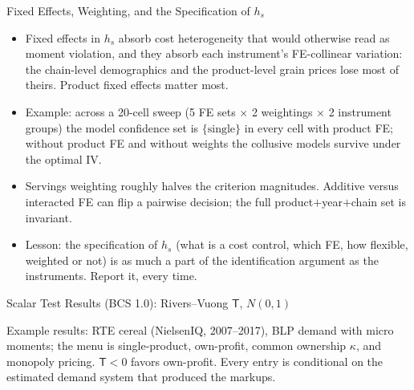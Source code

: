 \documentclass[aspectratio=169,10pt]{beamer}
\begin{document}
\begin{frame}{Fixed Effects, Weighting, and the Specification of $h_s$}
\begin{itemize}
\item Fixed effects in $h_s$ absorb cost heterogeneity that would otherwise read as moment violation, and they absorb each instrument's FE-collinear variation: the chain-level demographics and the product-level grain prices lose most of theirs. Product fixed effects matter most.
\item Example: across a 20-cell sweep (5 FE sets $\times$ 2 weightings $\times$ 2 instrument groups) the model confidence set is $\{\text{single}\}$ in every cell with product FE; without product FE and without weights the \alert{collusive} models survive under the optimal IV.
\item Servings weighting roughly halves the criterion magnitudes. Additive versus interacted FE can flip a pairwise decision; the full product$+$year$+$chain set is invariant.
\item Lesson: the \alert{specification} of $h_s$ (what is a cost control, which FE, how flexible, weighted or not) is as much a part of the identification argument as the instruments. Report it, every time.
\end{itemize}
\end{frame}


\begin{frame}[plain,label=mainresults]{Scalar Test Results (BCS 1.0): Rivers--Vuong $\mathsf{T}$, $N(0,1)$}
\begin{center}
\scalebox{0.5}{}
\end{center}
\vspace{-0.2cm}
{\footnotesize Example results: RTE cereal (NielsenIQ, 2007--2017), BLP demand with micro moments; the menu is single-product, own-profit, common ownership $\kappa$, and monopoly pricing. $\mathsf{T} < 0$ favors own-profit. Every entry is conditional on the estimated demand system that produced the markups.}
\end{frame}
\end{document}
